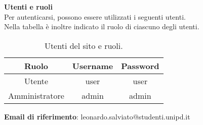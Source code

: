 \begin{center}
    \textbf{Utenti e ruoli}
    \\
    Per autenticarsi, possono essere utilizzati i seguenti utenti. \\Nella tabella è inoltre indicato il ruolo di ciascuno degli utenti.
\end{center}
\begin{table}[H]
    \centering
    \begin{tabular}{|c|c|c|}
        \hline
        \cellcolor[HTML]{FFCC00} \textbf{Ruolo} & \cellcolor[HTML]{FFCC00} \textbf{Username} & \cellcolor[HTML]{FFCC00} \textbf{Password}       \\ 
        \hline
        Utente & user & user \\ 
        \hline
        Amministratore & admin & admin\\ 
        \hline
    \end{tabular}
    \caption{Utenti del sito e ruoli.}
\end{table}

\begin{center}
    \textbf{Email di riferimento}:
    leonardo.salviato@studenti.unipd.it
\end{center}